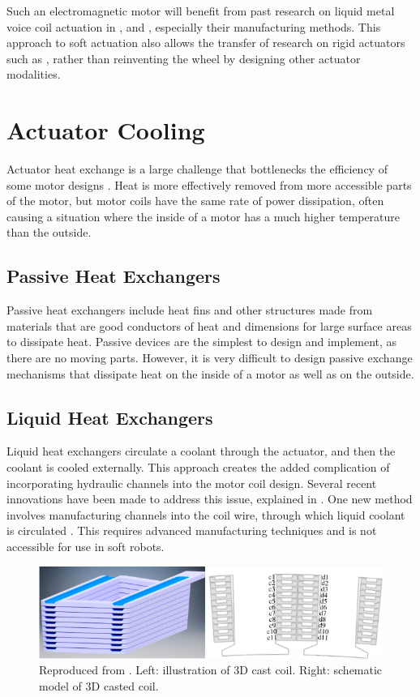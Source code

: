 \documentclass[a4paper,12pt]{article}
\begin{document}
Such an electromagnetic motor will benefit from past research on liquid metal voice coil actuation in \cite{jinStretchableLoudspeakerUsing2015}, \cite{guoLiquidMetalSpiral2018} and \cite{doMiniatureSoftElectromagnetic2018}, especially their manufacturing methods. This approach to soft actuation also allows the transfer of research on rigid actuators such as \cite{ruddyDesignOptimizationStrategies2011}, rather than reinventing the wheel by designing other actuator modalities.

\section{Actuator Cooling}
Actuator heat exchange is a large challenge that bottlenecks the efficiency of some motor designs \cite{yoonEfficiencyIncreaseInduction2002}. Heat is more effectively removed from more accessible parts of the motor, but motor coils have the same rate of power dissipation, often causing a situation where the inside of a motor has a much higher temperature than the outside.

\subsection{Passive Heat Exchangers}
Passive heat exchangers include heat fins and other structures made from materials that are good conductors of heat and dimensions for large surface areas to dissipate heat. Passive devices are the simplest to design and implement, as there are no moving parts. However, it is very difficult to design passive exchange mechanisms that dissipate heat on the inside of a motor as well as on the outside.

\subsection{Liquid Heat Exchangers}
Liquid heat exchangers circulate a coolant through the actuator, and then the coolant is cooled externally. This approach creates the added complication of incorporating hydraulic channels into the motor coil design. Several recent innovations have been made to address this issue, explained in \cite{henkeChallengesOpportunitiesVery2018}. One new method involves manufacturing channels into the coil wire, through which liquid coolant is circulated \cite{wohlersDesignDirectLiquid2018}. This requires advanced manufacturing techniques and is not accessible for use in soft robots.

\begin{figure}[h!]
    \centering
    \includegraphics[width=\textwidth]{liquidcool.png}
    \caption{Reproduced from \cite{wohlersDesignDirectLiquid2018}. Left: illustration of 3D cast coil. Right: schematic model of 3D casted coil.}
    \label{fg:coilmotor}
\end{figure}
\end{document}
